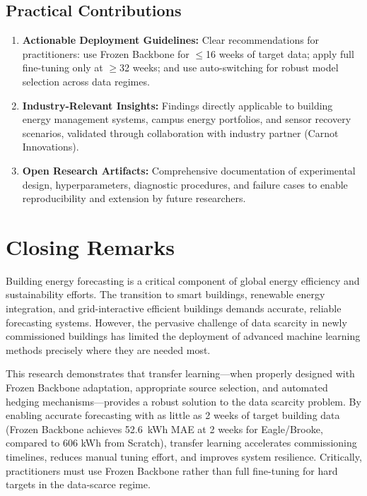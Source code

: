 \documentclass[12pt,a4paper]{report}
\begin{document}
\subsection{Practical Contributions}

\begin{enumerate}
    \item \textbf{Actionable Deployment Guidelines:} Clear recommendations for practitioners: use Frozen Backbone for $\leq$16 weeks of target data; apply full fine-tuning only at $\geq$32 weeks; and use auto-switching for robust model selection across data regimes.
    
    \item \textbf{Industry-Relevant Insights:} Findings directly applicable to building energy management systems, campus energy portfolios, and sensor recovery scenarios, validated through collaboration with industry partner (Carnot Innovations).
    
    \item \textbf{Open Research Artifacts:} Comprehensive documentation of experimental design, hyperparameters, diagnostic procedures, and failure cases to enable reproducibility and extension by future researchers.
\end{enumerate}

\section{Closing Remarks}

Building energy forecasting is a critical component of global energy efficiency and sustainability efforts. The transition to smart buildings, renewable energy integration, and grid-interactive efficient buildings demands accurate, reliable forecasting systems. However, the pervasive challenge of data scarcity in newly commissioned buildings has limited the deployment of advanced machine learning methods precisely where they are needed most.

This research demonstrates that transfer learning---when properly designed with Frozen Backbone adaptation, appropriate source selection, and automated hedging mechanisms---provides a robust solution to the data scarcity problem. By enabling accurate forecasting with as little as 2 weeks of target building data (Frozen Backbone achieves 52.6~kWh MAE at 2 weeks for Eagle/Brooke, compared to 606 kWh from Scratch), transfer learning accelerates commissioning timelines, reduces manual tuning effort, and improves system resilience. Critically, practitioners must use Frozen Backbone rather than full fine-tuning for hard targets in the data-scarce regime.
\end{document}
